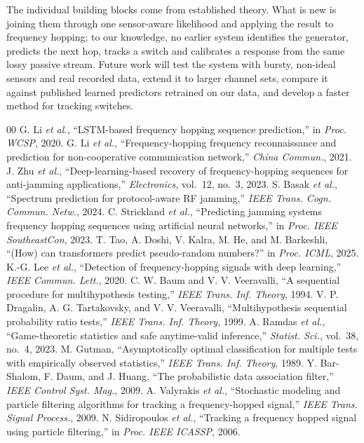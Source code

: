 \documentclass[conference]{IEEEtran}
\begin{document}
The individual building blocks come from established theory. What is new is
joining them through one sensor-aware likelihood and applying the result to
frequency hopping; to our knowledge, no earlier system identifies the
generator, predicts the next hop, tracks a switch and calibrates a response
from the same lossy passive stream. Future work will test the system with
bursty, non-ideal sensors and real recorded data, extend it to larger channel
sets, compare it against published learned predictors retrained on our data,
and develop a faster method for tracking switches.


\begin{thebibliography}{00}
 G. Li \emph{et al.}, ``LSTM-based frequency hopping
sequence prediction,'' in \emph{Proc. WCSP}, 2020.
 G. Li \emph{et al.}, ``Frequency-hopping frequency
reconnaissance and prediction for non-cooperative communication network,''
\emph{China Commun.}, 2021.
 J. Zhu \emph{et al.}, ``Deep-learning-based recovery
of frequency-hopping sequences for anti-jamming applications,''
\emph{Electronics}, vol.~12, no.~3, 2023.
 S. Basak \emph{et al.}, ``Spectrum prediction for
protocol-aware RF jamming,'' \emph{IEEE Trans. Cogn. Commun. Netw.}, 2024.
 C. Strickland \emph{et al.}, ``Predicting jamming
systems frequency hopping sequences using artificial neural networks,'' in
\emph{Proc. IEEE SoutheastCon}, 2023.
 T. Tao, A. Doshi, V. Kalra, M. He, and
M. Barkeshli, ``(How) can transformers predict pseudo-random numbers?'' in
\emph{Proc. ICML}, 2025.
 K.-G. Lee \emph{et al.}, ``Detection of
frequency-hopping signals with deep learning,'' \emph{IEEE Commun. Lett.}, 2020.
 C. W. Baum and V. V. Veeravalli, ``A sequential procedure for
multihypothesis testing,'' \emph{IEEE Trans. Inf. Theory}, 1994.
 V. P. Dragalin, A. G. Tartakovsky, and V. V. Veeravalli,
``Multihypothesis sequential probability ratio tests,'' \emph{IEEE Trans. Inf.
Theory}, 1999.
 A. Ramdas \emph{et al.}, ``Game-theoretic statistics and
safe anytime-valid inference,'' \emph{Statist. Sci.}, vol.~38, no.~4, 2023.
 M. Gutman, ``Asymptotically optimal classification for
multiple tests with empirically observed statistics,'' \emph{IEEE Trans. Inf.
Theory}, 1989.
 Y. Bar-Shalom, F. Daum, and J. Huang, ``The
probabilistic data association filter,'' \emph{IEEE Control Syst. Mag.}, 2009.
 A. Valyrakis \emph{et al.}, ``Stochastic modeling and
particle filtering algorithms for tracking a frequency-hopped signal,''
\emph{IEEE Trans. Signal Process.}, 2009.
 N. Sidiropoulos \emph{et al.}, ``Tracking a frequency
hopped signal using particle filtering,'' in \emph{Proc. IEEE ICASSP}, 2006.


\end{thebibliography}
\end{document}
